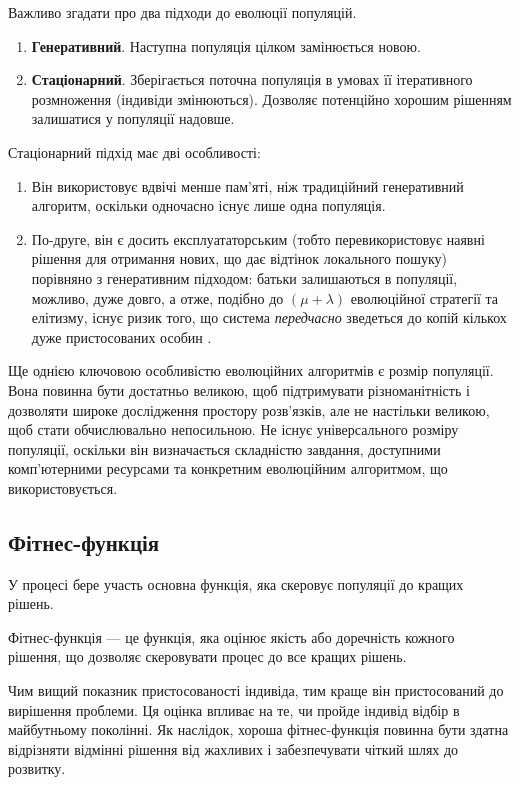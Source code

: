 Важливо згадати про два підходи до еволюції популяцій.
\begin{enumerate}
  \item \textbf{Генеративний}. Наступна популяція цілком замінюється новою.
  \item \textbf{Стаціонарний}. Зберігається поточна популяція
    в умовах її ітеративного розмноження (індивіди змінюються).
    Дозволяє потенційно хорошим рішенням залишатися у популяції надовше.
\end{enumerate}

Стаціонарний підхід має дві особливості:
\begin{enumerate}
  \item Він використовує вдвічі менше пам'яті, ніж традиційний генеративний алгоритм, оскільки одночасно існує лише одна популяція.
  \item По-друге, він є досить експлуататорським (тобто перевикористовує наявні
    рішення для отримання нових, що дає відтінок локального пошуку)
    порівняно з генеративним підходом: батьки залишаються в популяції,
    можливо, дуже довго, а отже, подібно до $(\mu + \lambda)$ еволюційної 
    стратегії та елітизму,
    існує ризик того, що система \textit{передчасно} зведеться до копій
    кількох дуже пристосованих особин \cite{luke_essentials_2013}.
\end{enumerate}

Ще однією ключовою особливістю еволюційних алгоритмів є розмір популяції. 
Вона повинна бути достатньо великою, щоб підтримувати різноманітність 
і дозволяти широке дослідження простору розв'язків, але не настільки 
великою, щоб стати обчислювально непосильною. 
Не існує універсального розміру популяції, оскільки він 
визначається складністю завдання, доступними комп'ютерними 
ресурсами та конкретним еволюційним алгоритмом, що використовується.



\subsection{Фітнес-функція}

У процесі бере участь основна функція, яка скеровує популяції до кращих рішень.
\begin{definition}
  Фітнес-функція --- це функція, яка оцінює якість або доречність кожного рішення,
  що дозволяє скеровувати процес до все кращих рішень.
\end{definition}

Чим вищий показник пристосованості індивіда, тим краще він
пристосований до вирішення проблеми. 
Ця оцінка впливає на те, чи пройде індивід відбір
в майбутньому поколінні. 
Як наслідок, хороша фітнес-функція повинна бути здатна 
відрізняти відмінні рішення від жахливих і забезпечувати 
чіткий шлях до розвитку.

